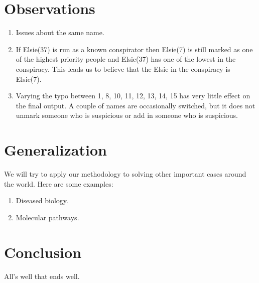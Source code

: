 \documentclass{icmmcm}
\begin{document}
\section{Observations}
\begin{enumerate}
\item Issues about the same name.

\item If Elsie(37) is run as a known conspirator then Elsie(7) is still marked as one of the highest priority people and Elsie(37) has one of the lowest in the conspiracy.  This leads us to believe that the Elsie in the conspiracy is Elsie(7).

\item Varying the typo between 1, 8, 10, 11, 12, 13, 14, 15 has very little effect on the final output.  A couple of names are occasionally switched, but it does not unmark someone who is suspicious or add in someone who is suspicious.
\end{enumerate}

\section{Generalization}
We will try to apply our methodology
to solving other important cases around the world.
Here are some examples:
\begin{enumerate}
\item Diseased biology.
\item Molecular pathways.
\end{enumerate}

\section{Conclusion}

All's well that ends well.






\end{document}
